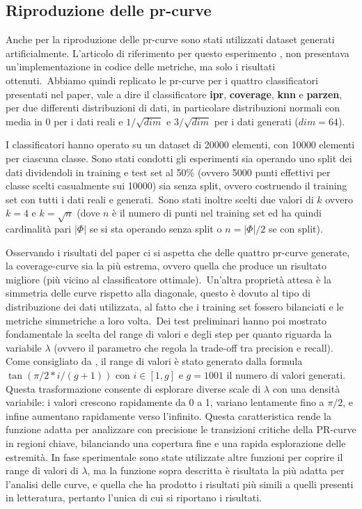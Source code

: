 \subsection{Riproduzione delle pr-curve}
\label{subsec:pr-curve}

Anche per la riproduzione delle pr-curve sono stati utilizzati dataset generati artificialmente. L'articolo di riferimento per questo esperimento \cite{6UnifyingPrecisionRecall}, non presentava un'implementazione in codice delle metriche, ma solo i risultati ottenuti.\
Abbiamo quindi replicato le pr-curve per i quattro classificatori presentati nel paper, vale a dire il classificatore \textbf{ipr}, \textbf{coverage}, \textbf{knn} e \textbf{parzen}, per due differenti distribuzioni di dati, in particolare distribuzioni normali con media in \(0\) per i dati reali  e \(1/\sqrt{dim}\) e \(3/\sqrt{dim}\) per i dati generati (\(dim = 64\)).\ 

I classificatori hanno operato su un dataset di 20000 elementi, con 10000 elementi per ciascuna classe. 
Sono stati condotti gli esperimenti sia operando uno split dei dati dividendoli in training e test set al 50\% (ovvero 5000 punti effettivi per classe scelti casualmente sui 10000) sia senza split, ovvero costruendo il training set con tutti i dati reali e generati.\
Sono stati inoltre scelti due valori di \( k \) ovvero \(k = 4\) e \(k = \sqrt{n}\) (dove \(n\) è il numero di punti nel training set ed ha quindi cardinalità pari \(|\Phi|\) se si sta operando senza split o \(n = |\Phi|/2 \) se con split).\

Osservando i risultati del paper ci si aspetta che delle quattro pr-curve generate, la coverage-curve sia la più estrema, ovvero quella che produce un risultato migliore (più vicino al classificatore ottimale).\
Un'altra proprietà attesa è la simmetria delle curve rispetto alla diagonale, questo è dovuto al tipo di distribuzione dei dati utilizzata, al fatto che i training set fossero bilanciati e le metriche simmetriche a loro volta.\
Dei test preliminari hanno poi mostrato fondamentale la scelta del range di valori e degli step per quanto riguarda la variabile \( \lambda \) (ovvero il parametro che regola la trade-off tra precision e recall). 
Come consigliato da \cite{7AssessingWithPrecisionRecall}, il range di valori è stato generato dalla formula \( \tan(\pi/2 * i/(g+1)) \) con \( i \in [1, g] \) e \( g = 1001\) il numero di valori generati. Questa trasformazione consente di esplorare diverse scale di \(\lambda\) con una densità variabile: i valori crescono rapidamente da 0 a 1, variano lentamente fino a \(\pi/2\)​, e infine aumentano rapidamente verso l'infinito. Questa caratteristica rende la funzione adatta per analizzare con precisione le transizioni critiche della PR-curve in regioni chiave, bilanciando una copertura fine e una rapida esplorazione delle estremità. 
In fase sperimentale sono state utilizzate altre funzioni per coprire il range di valori di \(\lambda\), ma la funzione sopra descritta è risultata la più adatta per l'analisi delle curve, e quella che ha prodotto i risultati più simili a quelli presenti in letteratura, pertanto l'unica di cui si riportano i risultati.

